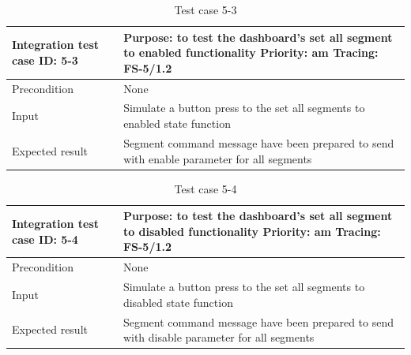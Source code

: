 \begin{table}[H]
	\caption{Test case 5-3}
	\label{table:TCase-FS5-3}
	\begin{center}
		\renewcommand{\arraystretch}{1.8}
		\begin{tabu} 
			to 0.9 \textwidth
			{  X[0.3, l] X[l] }
			\toprule
			Integration test case ID: 5-3 & Purpose: to test the dashboard's set all segment to enabled functionality   \newline Priority: am \newline Tracing: FS-5/1.2 \\ \midrule
			Precondition                  & None                                                                                                                         \\
			Input                         & Simulate a button press to the set all segments to enabled state function                                                    \\
			Expected result               & Segment command message have been prepared to send with enable parameter for all segments                                    \\ \bottomrule
		\end{tabu}
	\end{center}
\end{table}

\begin{table}[H]
	\caption{Test case 5-4}
	\label{table:TCase-FS5-4}
	\begin{center}
		\renewcommand{\arraystretch}{1.8}
		\begin{tabu} 
			to 0.9 \textwidth
			{  X[0.3, l] X[l] }
			\toprule
			Integration test case ID: 5-4 & Purpose: to test the dashboard's set all segment to disabled functionality  \newline Priority: am \newline Tracing: FS-5/1.2 \\ \midrule
			Precondition                  & None                                                                                                                         \\
			Input                         & Simulate a button press to the set all segments to disabled state function                                                   \\
			Expected result               & Segment command message have been prepared to send with disable parameter for all segments                                   \\ \bottomrule
		\end{tabu}
	\end{center}
\end{table}


